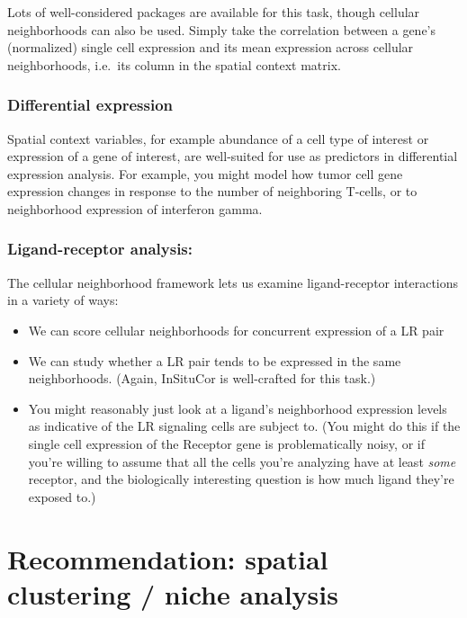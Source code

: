 \documentclass[
  letterpaper,
  DIV=11,
  numbers=noendperiod]{scrartcl}
\providecommand{\tightlist}{%
  \setlength{\itemsep}{0pt}\setlength{\parskip}{0pt}}\usepackage{longtable,booktabs,array}
\begin{document}
Lots of well-considered packages are available for this task, though
cellular neighborhoods can also be used. Simply take the correlation
between a gene's (normalized) single cell expression and its mean
expression across cellular neighborhoods, i.e.~its column in the spatial
context matrix.

\hypertarget{differential-expression}{%
\subsubsection{Differential expression}\label{differential-expression}}

Spatial context variables, for example abundance of a cell type of
interest or expression of a gene of interest, are well-suited for use as
predictors in differential expression analysis. For example, you might
model how tumor cell gene expression changes in response to the number
of neighboring T-cells, or to neighborhood expression of interferon
gamma.

\hypertarget{ligand-receptor-analysis}{%
\subsubsection{Ligand-receptor
analysis:}\label{ligand-receptor-analysis}}

The cellular neighborhood framework lets us examine ligand-receptor
interactions in a variety of ways:

\begin{itemize}
\tightlist
\item
  We can score cellular neighborhoods for concurrent expression of a LR
  pair
\item
  We can study whether a LR pair tends to be expressed in the same
  neighborhoods. (Again, InSituCor is well-crafted for this task.)
\item
  You might reasonably just look at a ligand's neighborhood expression
  levels as indicative of the LR signaling cells are subject to. (You
  might do this if the single cell expression of the Receptor gene is
  problematically noisy, or if you're willing to assume that all the
  cells you're analyzing have at least \emph{some} receptor, and the
  biologically interesting question is how much ligand they're exposed
  to.)
\end{itemize}

\hypertarget{recommendation-spatial-clustering-niche-analysis}{%
\section{Recommendation: spatial clustering / niche
analysis}\label{recommendation-spatial-clustering-niche-analysis}}
\end{document}
